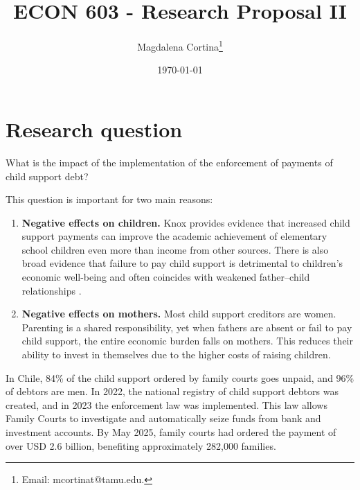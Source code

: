 




\title{\Large \textbf{ECON 603 - Research Proposal II}}

\author{Magdalena Cortina\thanks{Email: mcortinat@tamu.edu.}} 
\date{\today}

\maketitle
\thispagestyle{empty} 
\doublespacing
\thispagestyle{empty} 

\vspace{-10mm}

\doublespacing

\section{ Research question}

What is the impact of the implementation of the enforcement of payments of child support debt?

This question is important for two main reasons:

\begin{enumerate}
    \item \textbf{Negative effects on children.} Knox provides evidence that increased child support payments can improve the academic achievement of elementary school children even more than income from other sources. There is also broad evidence that failure to pay child support is detrimental to children’s economic well-being and often coincides with weakened father–child relationships \cite{CITE}.
    
    \item \textbf{Negative effects on mothers.} Most child support creditors are women. Parenting is a shared responsibility, yet when fathers are absent or fail to pay child support, the entire economic burden falls on mothers. This reduces their ability to invest in themselves due to the higher costs of raising children.
\end{enumerate}

In Chile, 84\% of the child support ordered by family courts goes unpaid, and 96\% of debtors are men. In 2022, the national registry of child support debtors was created, and in 2023 the enforcement law was implemented. This law allows Family Courts to investigate and automatically seize funds from bank and investment accounts. By May 2025, family courts had ordered the payment of over USD 2.6 billion, benefiting approximately 282,000 families.

